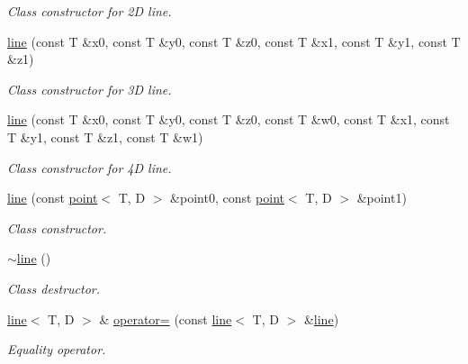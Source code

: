 \begin{DoxyCompactItemize}
\begin{DoxyCompactList}\small\item\em Class constructor for 2D line. \end{DoxyCompactList}\item 
\mbox{\label{classacme_1_1line_ab7491474615a867d5a46fd52efd99fbb}} 
\hyperlink{classacme_1_1line_ab7491474615a867d5a46fd52efd99fbb}{line} (const T \&x0, const T \&y0, const T \&z0, const T \&x1, const T \&y1, const T \&z1)
\begin{DoxyCompactList}\small\item\em Class constructor for 3D line. \end{DoxyCompactList}\item 
\mbox{\label{classacme_1_1line_a61d0ff7faa9411a5fa87f89f16866c00}} 
\hyperlink{classacme_1_1line_a61d0ff7faa9411a5fa87f89f16866c00}{line} (const T \&x0, const T \&y0, const T \&z0, const T \&w0, const T \&x1, const T \&y1, const T \&z1, const T \&w1)
\begin{DoxyCompactList}\small\item\em Class constructor for 4D line. \end{DoxyCompactList}\item 
\hyperlink{classacme_1_1line_a74c5376f08b0aad5010739a790972abc}{line} (const \hyperlink{classacme_1_1point}{point}$<$ T, D $>$ \&point0, const \hyperlink{classacme_1_1point}{point}$<$ T, D $>$ \&point1)
\begin{DoxyCompactList}\small\item\em Class constructor. \end{DoxyCompactList}\item 
\mbox{\label{classacme_1_1line_acf6ee035a572e1554bec62207b03a854}} 
\hyperlink{classacme_1_1line_acf6ee035a572e1554bec62207b03a854}{$\sim$line} ()
\begin{DoxyCompactList}\small\item\em Class destructor. \end{DoxyCompactList}\item 
\hyperlink{classacme_1_1line}{line}$<$ T, D $>$ \& \hyperlink{classacme_1_1line_acb882fdc149ed751a681151bcb7d4505}{operator=} (const \hyperlink{classacme_1_1line}{line}$<$ T, D $>$ \&\hyperlink{classacme_1_1line}{line})
\begin{DoxyCompactList}\small\item\em Equality operator. \end{DoxyCompactList}\item 

\end{DoxyCompactItemize}
